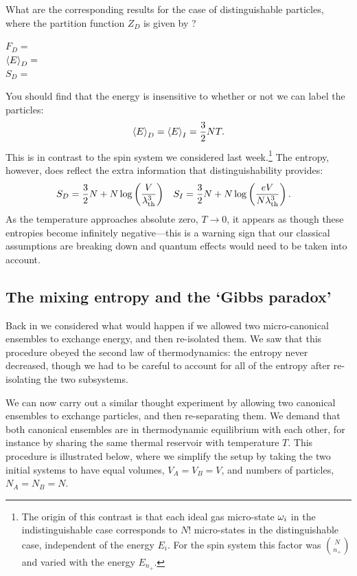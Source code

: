 \newpage %
What are the corresponding results for the case of distinguishable particles, where the partition function $Z_D$ is given by ?
\begin{mdframed}
  $\displaystyle F_D = $ \\[50 pt]
  $\displaystyle \left\langle E \right\rangle_D = $ \\[50 pt]
  $\displaystyle S_D = $ \\[50 pt]
\end{mdframed}
You should find that the energy is insensitive to whether or not we can label the particles:
\begin{equation}
  \label{eq:ideal_energy}
  \left\langle E \right\rangle_D = \left\langle E \right\rangle_I = \frac{3}{2} NT.
\end{equation}
This is in contrast to the spin system we considered last week.\footnote{The origin of this contrast is that each ideal gas micro-state $\omega_i$ in the indistinguishable case corresponds to $N!$ micro-states in the distinguishable case, independent of the energy $E_i$.  For the spin system this factor was $\binom{N}{n_+}$ and varied with the energy $E_{n_+}$.}
The entropy, however, does reflect the extra information that distinguishability provides:
\begin{align}
  \label{eq:ideal_entropy}
  S_D & = \frac{3}{2} N + N \log\left(\frac{V}{\lambda_{\mathrm{th}}^3}\right) &
  S_I & = \frac{3}{2} N + N \log\left(\frac{eV}{N\lambda_{\mathrm{th}}^3}\right).
\end{align}
As the temperature approaches absolute zero, $T \to 0$, it appears as though these entropies become infinitely negative---this is a warning sign that our classical assumptions are breaking down and quantum effects would need to be taken into account.



\subsection{The mixing entropy and the `Gibbs paradox'}
Back in  we considered what would happen if we allowed two micro-canonical ensembles to exchange energy, and then re-isolated them.
We saw that this procedure obeyed the second law of thermodynamics: the entropy never decreased, though we had to be careful to account for all of the entropy after re-isolating the two subsystems.

We can now carry out a similar thought experiment by allowing two canonical ensembles to exchange particles, and then re-separating them.
We demand that both canonical ensembles are in thermodynamic equilibrium with each other, for instance by sharing the same thermal reservoir with temperature $T$.
This procedure is illustrated below, where we simplify the setup by taking the two initial systems to have equal volumes, $V_A = V_B = V$, and numbers of particles, $N_A = N_B = N$.

